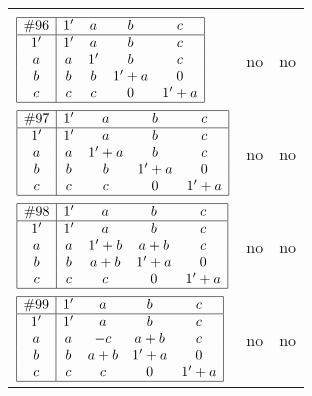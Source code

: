 \documentclass[12pt]{article}
\newcommand{\join}{\mathbin{+}}%
\newcommand{\id}{{1'}}%
\begin{document}
\begin{center}
\begin{longtable}{l|c|c}
{\begin{tikzpicture}[<->,shorten <=1pt,shorten >=1pt,label distance=0mm, font=\small]
\end{tikzpicture}
}      \\[15mm]

$
\begin{array}{|c|cccc|} \hline
\#96 & \id & a & b & c \\ \hline
\id & \id & a & b & c \\
a & a & \id & b & c \\
b & b & b & \id \join a & 0 \\
c & c & c & 0 & \id \join a \\ \hline
\end{array}
$
 & no  
 & no      \\[15mm]

$
\begin{array}{|c|cccc|} \hline
\#97 & \id & a & b & c \\ \hline
\id & \id & a & b & c \\
a & a & \id \join a & b & c \\
b & b & b & \id \join a & 0 \\
c & c & c & 0 & \id \join a \\ \hline
\end{array}
$
 & no  
 & no      \\[15mm]

$
\begin{array}{|c|cccc|} \hline
\#98 & \id & a & b & c \\ \hline
\id & \id & a & b & c \\
a & a & \id \join b & a \join b & c \\
b & b & a \join b & \id \join a & 0 \\
c & c & c & 0 & \id \join a \\ \hline
\end{array}
$
 & no  
 & no      \\[15mm]

$
\begin{array}{|c|cccc|} \hline
\#99 & \id & a & b & c \\ \hline
\id & \id & a & b & c \\
a & a & -c & a \join b & c \\
b & b & a \join b & \id \join a & 0 \\
c & c & c & 0 & \id \join a \\ \hline
\end{array}
$
 & no  
 & no      \\[15mm]


\end{longtable}
\end{center}
\end{document}
